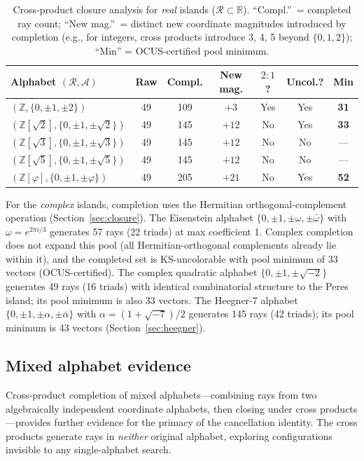 \documentclass[12pt,a4paper]{article}
\newcommand{\R}{\mathbb{R}}
\newcommand{\Z}{\mathbb{Z}}
\begin{document}
\begin{table}[ht]
\centering
\caption{Cross-product closure analysis for \emph{real} islands ($\mathcal{R} \subset \R$). ``Compl.''\ = completed ray count; ``New mag.''\ = distinct new coordinate magnitudes introduced by completion (e.g., for integers, cross products introduce 3, 4, 5 beyond $\{0,1,2\}$); ``Min'' = OCUS-certified pool minimum.}
\label{tab:closure}
\small
\begin{tabular}{lcccccc}
\toprule
Alphabet $(\mathcal{R}, \mathcal{A})$ & Raw & Compl. & New mag. & $2{:}1$? & Uncol.? & Min \\
\midrule
$(\Z, \{0,\pm 1,\pm 2\})$ & 49 & 109 & $+3$ & Yes & Yes & \textbf{31} \\
$(\Z[\sqrt{2}], \{0,\pm 1,\pm\!\sqrt{2}\})$ & 49 & 145 & $+12$ & No & Yes & \textbf{33} \\
$(\Z[\sqrt{3}], \{0,\pm 1,\pm\!\sqrt{3}\})$ & 49 & 145 & $+12$ & No & No & --- \\
$(\Z[\sqrt{5}], \{0,\pm 1,\pm\!\sqrt{5}\})$ & 49 & 145 & $+12$ & No & No & --- \\
$(\Z[\varphi], \{0,\pm 1,\pm\varphi\})$ & 49 & 205 & $+21$ & No & Yes & \textbf{52} \\
\bottomrule
\end{tabular}

\medskip
\noindent For the \emph{complex} islands, completion uses the Hermitian orthogonal-complement operation (Section~\ref{sec:closure}). The Eisenstein alphabet $\{0, \pm 1, \pm\omega, \pm\bar\omega\}$ with $\omega = e^{2\pi i/3}$ generates 57 rays (22 triads) at max coefficient 1. Complex completion does not expand this pool (all Hermitian-orthogonal complements already lie within it), and the completed set is KS-uncolorable with pool minimum of 33 vectors (OCUS-certified). The complex quadratic alphabet $\{0, \pm 1, \pm\sqrt{-2}\}$ generates 49 rays (16 triads) with identical combinatorial structure to the Peres island; its pool minimum is also 33 vectors. The Heegner-7 alphabet $\{0, \pm 1, \pm\alpha, \pm\bar\alpha\}$ with $\alpha = (1+\sqrt{-7})/2$ generates 145 rays (42 triads); its pool minimum is 43 vectors (Section~\ref{sec:heegner}).
\end{table}

\subsection{Mixed alphabet evidence}\label{sec:mixed}

Cross-product completion of mixed alphabets---combining rays from two algebraically independent coordinate alphabets, then closing under cross products---provides further evidence for the primacy of the cancellation identity. The cross products generate rays in \emph{neither} original alphabet, exploring configurations invisible to any single-alphabet search.
\end{document}
